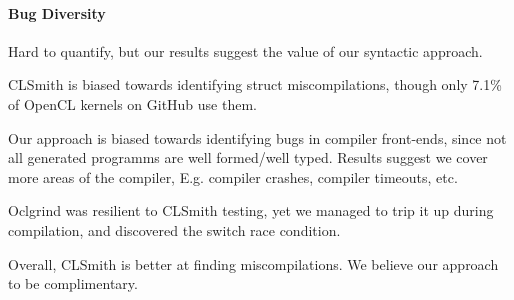 \paragraph{Bug Diversity}

Hard to quantify, but our results suggest the value of our syntactic approach.

CLSmith is biased towards identifying struct miscompilations, though only 7.1\% of OpenCL kernels on GitHub use them. 

Our approach is biased towards identifying bugs in compiler front-ends, since not all generated programms are well formed/well typed. Results suggest we cover more areas of the compiler, E.g. compiler crashes, compiler timeouts, etc.

Oclgrind was resilient to CLSmith testing, yet we managed to trip it up during compilation, and discovered the switch race condition.

Overall, CLSmith is better at finding miscompilations. We believe our approach to be complimentary.

